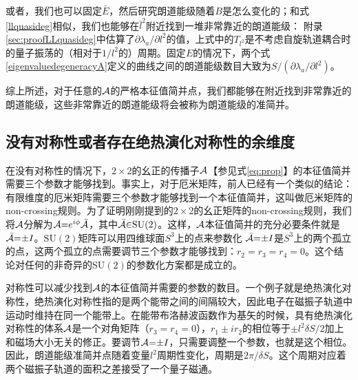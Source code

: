 或者，我们也可以固定$\bar{E}$，然后研究朗道能级随着$B$是怎么变化的；和式\ref{llquasideg}相似，我们也能够在$\bar{l}^2$附近找到一堆非常靠近的朗道能级：
附录\ref{sec:proofLLquasideg}中估算了$\partial \lambda_a/\partial l^2$的值，上式中的$T_{l^2}$是不考虑自旋轨道耦合时的量子振荡的（相对于$1/l^2$的）周期。固定$E$的情况下，两个式\ref{eigenvaluedegeneracyA}定义的曲线之间的朗道能级数目大致为$S/(\partial \lambda_a/\partial l^2)$。


综上所述，对于任意的${\cal A}$的严格本征值简并点，我们都能够在附近找到非常靠近的朗道能级，这些非常靠近的朗道能级将会被称为朗道能级的准简并。


\subsection{没有对称性或者存在绝热演化对称性的余维度}\label{sec:introducecodimension}

在没有对称性的情况下，$2\times 2$的幺正的传播子${\cal A}$【参见式\ref{eq:prop}】的本征值简并需要三个参数才能够找到。事实上，对于厄米矩阵，前人已经有一个类似的结论：有限维度的厄米矩阵需要三个参数才能够找到一个本征值简并\cite{neumann2000behaviour}，这叫做厄米矩阵的non-crossing规则。为了证明刚刚提到的$2\times 2$的幺正矩阵的non-crossing规则，我们将${\cal A}$分解为${\cal A}{=}e^{i\phi}{\cal \bar{A}}$，其中${\cal \bar{A}}{\in}\text{SU}(2)$。这样，${\cal A}$本征值简并的充分必要条件就是${\cal \bar{A}}{=}{\pm}I$。$\text{SU}(2)$矩阵可以用四维球面$S^3$上的点来参数化 
${\cal\bar{A}}{=}{\pm}I$是$S^3$上的两个孤立的点，这两个孤立的点需要调节三个参数才能够找到：$r_2{=}r_3{=}r_4{=}0$。这个结论对任何的非奇异的SU$(2)$的参数化方案都是成立的。


对称性可以减少找到${\cal A}$的本征值简并需要的参数的数目。一个例子就是绝热演化对称性，绝热演化对称性指的是两个能带之间的间隔较大，因此电子在磁振子轨道中运动时维持在同一个能带上。在能带布洛赫波函数作为基矢的时候，具有绝热演化对称性的体系${\cal A}$是一个对角矩阵（$r_3{=}r_4{=}0$），$r_1{\pm}ir_2$的相位等于${\pm} l^2\delta S/2$加上和磁场大小无关的修正。要调节${\cal A}{=}{\pm}I$，只需要调整一个参数，也就是这个相位。因此，朗道能级准简并点随着变量$l^2$周期性变化，周期是$2\pi/\delta S$。这个周期对应着两个磁振子轨道的面积之差接受了一个量子磁通。


